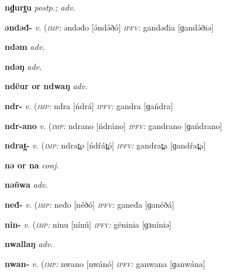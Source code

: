 {\newentry
\headword\textbf{nd̪urt̪u}  
\ipa{[nd̪urt̪u]}
\synpos\textit{postp.; adv.} 

\newentry
\headword\textbf{əndəđ-}  
\ipa{[ə́ndə́ð-]}
\synpos\textit{v.} 
\imperative(\textit {\textsc{imp:}} əndəđo [ə́ndə́ðó]
\imperfective\textit{\textsc{ipfv:}} gandəđia [ɡandə́ðiə] 

\newentry
\headword\textbf{ndəm}  
\ipa{[ndəm]}
\synpos\textit{adv.} 

\newentry
\headword\textbf{ndəŋ}  
\ipa{[ndəŋ]}
\synpos\textit{adv.} 

\newentry
\headword\textbf{ndëur or ndwaŋ}  
\synpos\textit{adv.} %

\newentry
\headword\textbf{ndr-}  
\ipa{[ńdr-]}
\synpos\textit{v.} 
\imperative(\textit {\textsc{imp:}} ndra [ńdrá] %
\imperfective\textit{\textsc{ipfv:}} gandra [ɡańdra] 

\newentry
\headword\textbf{ndr-ano}  
\ipa{[ńdr-ano]}
\synpos\textit{v.} 
\imperative(\textit {\textsc{imp:}} ndrano [ńdráno] %
\imperfective\textit{\textsc{ipfv:}} gandrano [ɡańdrano] 

\newentry
\headword\textbf{ndrat̪-}  
\ipa{[ńdrát̪-]}
\synpos\textit{v.} 
\imperative(\textit {\textsc{imp:}} ndrat̪o [ńdŕát̪ó]
\imperfective\textit{\textsc{ipfv:}} gandrat̪a [ɡandŕat̪a] 

\newentry
\headword\textbf{nə or na}  
\synpos\textit{conj.} 

\newentry
\headword\textbf{nəñwa}  
\ipa{[nəɲwa}
\synpos\textit{adv.} 

\newentry
\headword\textbf{neđ-}  
\ipa{[néð-]}
\synpos\textit{v.} 
\imperative(\textit {\textsc{imp:}} neđo [néðó]
\imperfective\textit{\textsc{ipfv:}} ganeđa [ɡanéðá] 

\newentry
\headword\textbf{nin-}  
\ipa{[nín-]}
\synpos\textit{v.} 
\imperative(\textit {\textsc{imp:}} ninu [nínú]
\imperfective\textit{\textsc{ipfv:}} gëninia [ɡɜníniə]


\newentry
\headword\textbf{nwallaŋ}  
\ipa{[nwalːaŋ]}
\synpos\textit{adv.} 

\newentry
\headword\textbf{nwan-}  
\ipa{[nwán-]}
\synpos\textit{v.} 
\imperative(\textit {\textsc{imp:}} nwano [nwánó]
\imperfective\textit{\textsc{ipfv:}} ganwana [ɡanwána]

}
